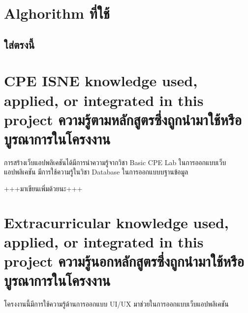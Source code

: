 \section{Alghorithm ที่ใช้}

\subsection{ใส่ตรงนี้}







\section{\ifenglish%
\ifcpe CPE \else ISNE \fi knowledge used, applied, or integrated in this project
\else%
ความรู้ตามหลักสูตรซึ่งถูกนำมาใช้หรือบูรณาการในโครงงาน
\fi
}
การสร้างเว็บแอปพลิเคชันได้มีการนำความรู้จากวิชา Basic CPE Lab ในการออกแบบเว็บแอปพลิเคชัน มีการใช้ความรู้ในวิชา Database
ในการออกแบบบฐานข้อมูล

+++มาเขียนเพิ่มด้วยนะ+++
\section{\ifenglish%
Extracurricular knowledge used, applied, or integrated in this project
\else%
ความรู้นอกหลักสูตรซึ่งถูกนำมาใช้หรือบูรณาการในโครงงาน
\fi
}
โครงงานนี้มีการใช้ความรู้ด้านการออกแบบ UI/UX มาช่วยในการออกแบบเว็บแอปพลิเคชัน 
